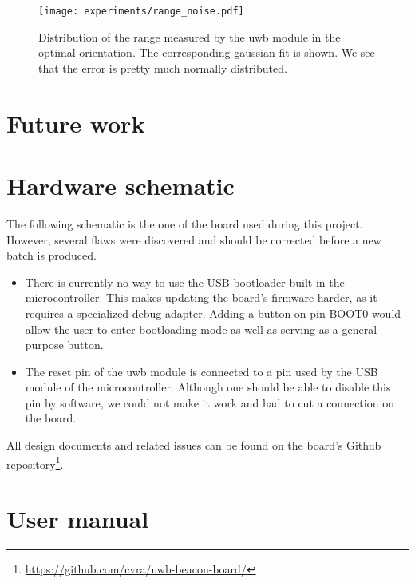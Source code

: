 \documentclass[a4paper, 12pt]{scrreprt}
\begin{document}
\begin{figure}[h]
    \centering
    \texttt{[image: experiments/range\_noise.pdf]}
    \caption{Distribution of the range measured by the \gls{uwb} module in the optimal orientation.
        The corresponding gaussian fit is shown.
        We see that the error is pretty much normally distributed.
    }
    \label{fig:range_noise}
\end{figure}


\chapter{Future work}
\appendix
\chapter{Hardware schematic}

The following schematic is the one of the board used during this project.
However, several flaws were discovered and should be corrected before a new batch is produced.

\begin{itemize}
    \item There is currently no way to use the USB bootloader built in the microcontroller.
        This makes updating the board's firmware harder, as it requires a specialized debug adapter.
        Adding a button on pin BOOT0 would allow the user to enter bootloading mode as well as serving as a general purpose button.
    \item The reset pin of the \gls{uwb} module is connected to a pin used by the USB module of the microcontroller.
        Although one should be able to disable this pin by software, we could not make it work and had to cut a connection on the board.
\end{itemize}

All design documents and related issues can be found on the board's Github repository\footnote{\url{https://github.com/cvra/uwb-beacon-board/}}.




\chapter{User manual}


\clearpage
\nocite{*} %


\end{document}
